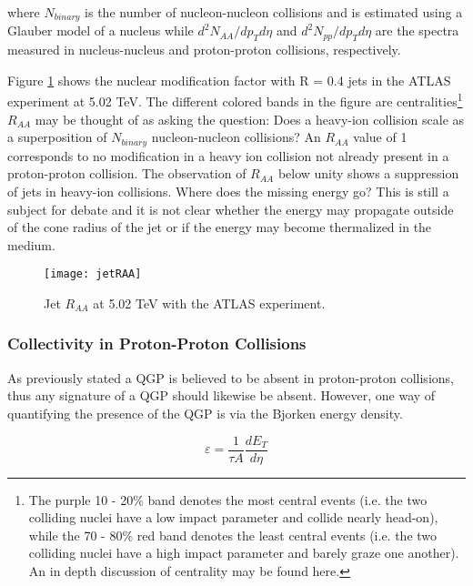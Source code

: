 \noindent
where $N_{binary}$ is the number of nucleon-nucleon collisions and is estimated using a Glauber model\cite{Miller:2007ri} of a nucleus while $d^{2}N_{AA}/dp_{T}d\eta$ and $d^{2}N_{pp}/dp_{T}d\eta$ are the spectra measured in nucleus-nucleus and proton-proton collisions, respectively. 

Figure \ref{fig:JetRAA} shows the nuclear modification factor with R = 0.4 jets in the ATLAS experiment at 5.02 TeV\cite{Aaboud:2018twu}.  The different colored bands in the figure are centralities\footnote{The purple 10 - 20\% band denotes the most central events (i.e. the two colliding nuclei have a low impact parameter and collide nearly head-on), while the 70 - 80\% red band denotes the least central events (i.e. the two colliding nuclei have a high impact parameter and barely graze one another).  An in depth discussion of centrality may be found here\cite{Klochkov_2017}.}  $R_{AA}$ may be thought of as asking the question: Does a heavy-ion collision scale as a superposition of $N_{binary}$ nucleon-nucleon collisions?  An $R_{AA}$ value of 1 corresponds to no modification in a heavy ion collision not already present in a proton-proton collision.  The observation of $R_{AA}$ below unity shows a suppression of jets in heavy-ion collisions.  Where does the missing energy go?  This is still a subject for debate and it is not clear whether the energy may propagate outside of the cone radius of the jet or if the energy may become thermalized in the medium.

\begin{figure}[t!]
\texttt{[image: jetRAA]}
\centering
\caption{Jet $R_{AA}$ at 5.02 TeV with the ATLAS experiment\cite{Aaboud:2018twu}.}
\label{fig:JetRAA}
\end{figure}




\subsubsection{Collectivity in Proton-Proton Collisions}
As previously stated a QGP is believed to be absent in proton-proton collisions, thus any signature of a QGP should likewise be absent.  However, one way of quantifying the presence of the QGP is via the Bjorken energy density.  

\begin{equation}
\varepsilon = \frac{1}{\tau A} \frac{dE_{T}}{d \eta}
\label{eq:bjorkenEt}
\end{equation}

